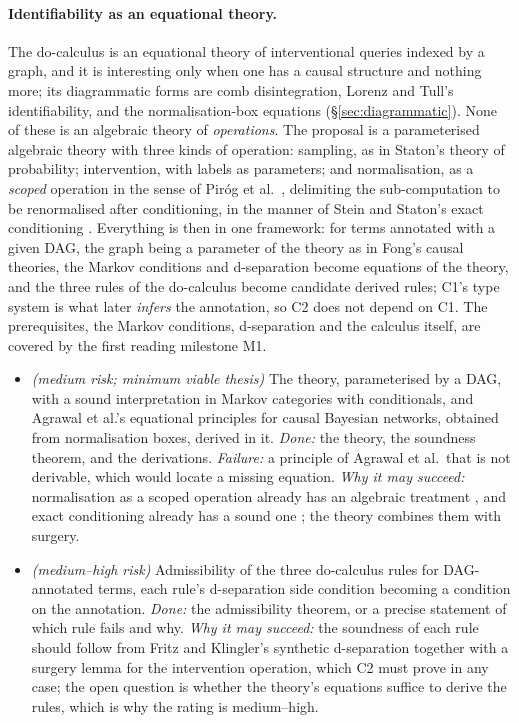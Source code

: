 \paragraph{Identifiability as an equational theory.} The do-calculus is an equational theory of interventional queries indexed by a graph, and it is interesting only when one has a causal structure and nothing more; its diagrammatic forms are comb disintegration, Lorenz and Tull's identifiability, and the normalisation-box equations (\S\ref{sec:diagrammatic}). None of these is an algebraic theory of \emph{operations}. The proposal is a parameterised algebraic theory with three kinds of operation: sampling, as in Staton's theory of probability; intervention, with labels as parameters; and normalisation, as a \emph{scoped} operation in the sense of Piróg et al.\ \cite{pirog2018scoped}, delimiting the sub-computation to be renormalised after conditioning, in the manner of Stein and Staton's exact conditioning \cite{stein2021exact}. Everything is then in one framework: for terms annotated with a given DAG, the graph being a parameter of the theory as in Fong's causal theories, the Markov conditions and d-separation become equations of the theory, and the three rules of the do-calculus become candidate derived rules; C1's type system is what later \emph{infers} the annotation, so C2 does not depend on C1. The prerequisites, the Markov conditions, d-separation and the calculus itself, are covered by the first reading milestone M1.
\begin{itemize}[nosep]
\item[C2] \textit{(medium risk; minimum viable thesis)} The theory, parameterised by a DAG, with a sound interpretation in Markov categories with conditionals, and Agrawal et al.'s equational principles for causal Bayesian networks, obtained from normalisation boxes, derived in it. \emph{Done:} the theory, the soundness theorem, and the derivations. \emph{Failure:} a principle of Agrawal et al.\ that is not derivable, which would locate a missing equation. \emph{Why it may succeed:} normalisation as a scoped operation already has an algebraic treatment \cite{pirog2018scoped}, and exact conditioning already has a sound one \cite{stein2021exact}; the theory combines them with surgery.
\item[C3] \textit{(medium--high risk)} Admissibility of the three do-calculus rules for DAG-annotated terms, each rule's d-separation side condition becoming a condition on the annotation. \emph{Done:} the admissibility theorem, or a precise statement of which rule fails and why. \emph{Why it may succeed:} the soundness of each rule should follow from Fritz and Klingler's synthetic d-separation together with a surgery lemma for the intervention operation, which C2 must prove in any case; the open question is whether the theory's equations suffice to derive the rules, which is why the rating is medium--high.
\end{itemize}

